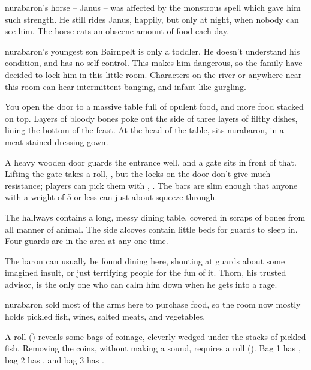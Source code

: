 
\Gls{nurabaron}'s horse -- Janus -- was affected by the monstrous spell which gave him such strength.
He still rides Janus, happily, but only at night, when nobody can see him.
The horse eats an obscene amount of food each day.


\Gls{nurabaron}'s youngest son Bairnpelt is only a toddler.
He doesn't understand his condition, and has no self control.
This makes him dangerous, so the family have decided to lock him in this little room.
Characters on the river or anywhere near this room can hear intermittent banging, and infant-like gurgling.

\begin{boxtext}

  You open the door to a massive table full of opulent food, and more food stacked on top.  Layers of bloody bones poke out the side of three layers of filthy dishes, lining the bottom of the feast.  At the head of the table, sits \gls{nurabaron}, in a meat-stained dressing gown.

\end{boxtext}


A heavy wooden door guards the entrance well, and a gate sits in front of that.
Lifting the gate takes a  roll, \tn[10], but the locks on the door don't give much resistance; players can pick them with , \tn[8].
The bars are slim enough that anyone with a \gls{weight} of 5 or less can just about squeeze through.

The hallways contains a long, messy dining table, covered in scraps of bones from all manner of animal.
The side alcoves contain little beds for guards to sleep in.  Four guards are in the area at any one time.

The baron can usually be found dining here, shouting at guards about some imagined insult, or just terrifying people for the fun of it.
Thorn, his trusted advisor, is the only one who can calm him down when he gets into a rage.


\Gls{nurabaron} sold most of the arms here to purchase food, so the room now mostly holds pickled fish, wines, salted meats, and vegetables.

A  roll (\tn[10]) reveals some bags of coinage, cleverly wedged under the stacks of pickled fish.
Removing the coins, without making a sound, requires a  roll (\tn[12]).
Bag 1 has \lootMedium, bag 2 has \lootMedium, and bag 3 has \lootBig.

